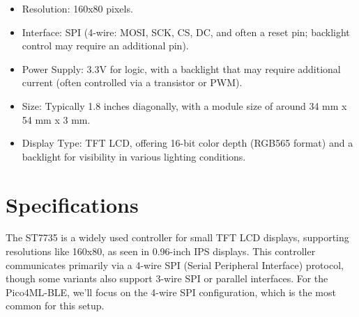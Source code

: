 \begin{itemize}

	\item Resolution: 160x80 pixels.

	\item Interface: SPI (4-wire: MOSI, SCK, CS, DC, and often a reset pin; backlight control may require an additional pin).

	\item Power Supply: 3.3V for logic, with a backlight that may require additional current (often controlled via a transistor or PWM).

	\item Size: Typically 1.8 inches diagonally, with a module size of around 34 mm x 54 mm x 3 mm.

	\item Display Type: TFT LCD, offering 16-bit color depth (RGB565 format) and a backlight for visibility in various lighting conditions.\cite{Sitronix:2010}

\end{itemize}



\section{Specifications}

The ST7735 is a widely used controller for small TFT LCD displays, supporting resolutions like 160x80, as seen in 0.96-inch IPS displays. This controller communicates primarily via a 4-wire SPI (Serial Peripheral Interface) protocol, though some variants also support 3-wire SPI or parallel interfaces. For the Pico4ML-BLE, we’ll focus on the 4-wire SPI configuration, which is the most common for this setup.




